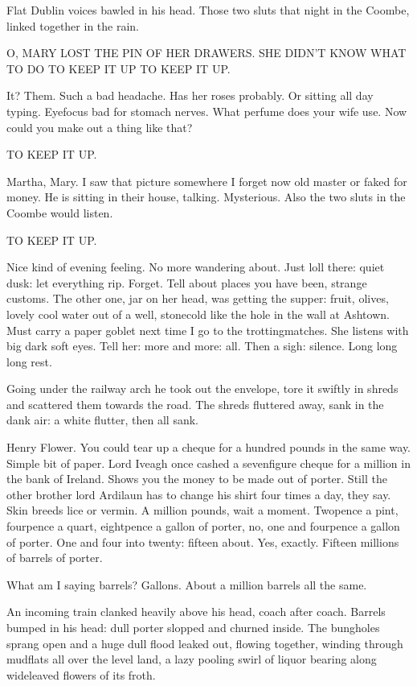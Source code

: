Flat Dublin voices bawled in his head. Those two sluts that night in
the Coombe, linked together in the rain.


    O, MARY LOST THE PIN OF HER DRAWERS.
    SHE DIDN'T KNOW WHAT TO DO
    TO KEEP IT UP
    TO KEEP IT UP.


It? Them. Such a bad headache. Has her roses probably. Or sitting all day
typing. Eyefocus bad for stomach nerves. What perfume does your wife
use. Now could you make out a thing like that?

    TO KEEP IT UP.

Martha, Mary. I saw that picture somewhere I forget now old master or
faked for money. He is sitting in their house, talking. Mysterious. Also
the two sluts in the Coombe would listen.

    TO KEEP IT UP.

Nice kind of evening feeling. No more wandering about. Just loll there:
quiet dusk: let everything rip. Forget. Tell about places you have been,
strange customs. The other one, jar on her head, was getting the supper:
fruit, olives, lovely cool water out of a well, stonecold like the hole in
the wall at Ashtown. Must carry a paper goblet next time I go to the
trottingmatches. She listens with big dark soft eyes. Tell her: more and
more: all. Then a sigh: silence. Long long long rest.

Going under the railway arch he took out the envelope, tore it swiftly
in shreds and scattered them towards the road. The shreds fluttered away,
sank in the dank air: a white flutter, then all sank.

Henry Flower. You could tear up a cheque for a hundred pounds in
the same way. Simple bit of paper. Lord Iveagh once cashed a sevenfigure
cheque for a million in the bank of Ireland. Shows you the money to be
made out of porter. Still the other brother lord Ardilaun has to change
his shirt four times a day, they say. Skin breeds lice or vermin. A
million pounds, wait a moment. Twopence a pint, fourpence a quart,
eightpence a gallon of porter, no, one and fourpence a gallon of porter.
One and four into twenty: fifteen about. Yes, exactly. Fifteen millions of
barrels of porter.

What am I saying barrels? Gallons. About a million barrels all the same.

An incoming train clanked heavily above his head, coach after coach.
Barrels bumped in his head: dull porter slopped and churned inside. The
bungholes sprang open and a huge dull flood leaked out, flowing together,
winding through mudflats all over the level land, a lazy pooling swirl of
liquor bearing along wideleaved flowers of its froth.

